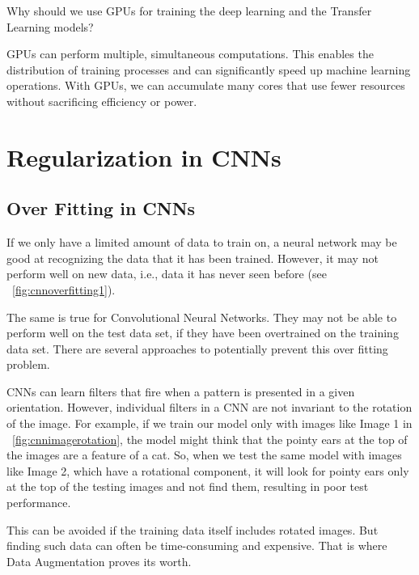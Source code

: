 	\begin{qanda}
		\begin{question}
Why should we use GPUs for training the deep learning and the Transfer Learning models?
		\end{question}
		\begin{answer}
GPUs can perform multiple, simultaneous computations. This enables the distribution of training processes and can significantly speed up machine learning operations. With GPUs, we can accumulate many cores that use fewer resources without sacrificing efficiency or power.
		\end{answer}
	\end{qanda}


	\section{Regularization in CNNs}
	\subsection{Over Fitting in CNNs}
	\begin{bulletedlist}
		\item If we only have a limited amount of data to train on, a neural network may be good at recognizing the data that it has been trained. However, it may not perform well on new data, i.e., data it has never seen before (see \figurename~\ref{fig:cnnoverfitting1}).
		\item The same is true for Convolutional Neural Networks. They may not be able to perform well on the
test data set, if they have been overtrained on the training data set. There are several
approaches to potentially prevent this over fitting problem.
		\item CNNs can learn filters that fire when a pattern is presented in a given orientation.  However, individual filters in a CNN are not invariant to the rotation of the image.  For example, if we train our model only with images like Image 1 in \figurename~\ref{fig:cnnimagerotation}, the model might think that the pointy ears at the top of the images are a feature of a cat. So, when we test the same model with images like Image 2, which have a rotational component, it will look for pointy ears only at the top of the testing images and not find them, resulting in poor test performance.
		\item This can be avoided if the training data itself includes rotated images.  But finding such data can often be time-consuming and expensive.  That is where Data Augmentation proves its worth.
	\end{bulletedlist}

